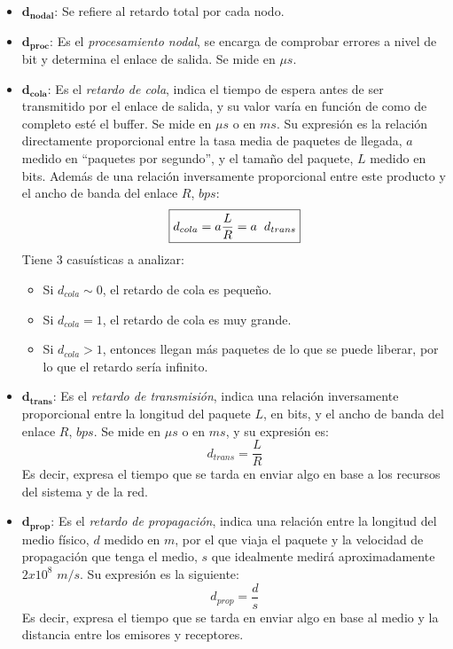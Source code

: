 \begin{itemize}
        \item \(\mathbf{d_{nodal}}\): Se refiere al retardo total por cada nodo.
        \item \(\mathbf{d_{proc}}\): Es el \textit{procesamiento nodal}, se encarga de comprobar errores a nivel de bit y determina el enlace de salida. Se mide en \(\mu s\).
        \item \(\mathbf{d_{cola}}\): Es el \textit{retardo de cola}, indica el tiempo de espera antes de ser transmitido por el enlace de salida, y su valor varía en función de como de completo esté el buffer. Se mide en \(\mu s\) o en \(ms\). Su expresión es la relación directamente proporcional entre la tasa media de paquetes de llegada, \(a\) medido en ``paquetes por segundo'', y el tamaño del paquete, \(L\) medido en bits. Además de una relación inversamente proporcional entre este producto y el ancho  de banda del enlace \(R\), \(bps\):
              \[
                      \boxed{d_{cola} = a \frac{L}{R} = a \hspace{2mm}d_{trans}}
              \]
              Tiene 3 casuísticas a analizar:
              \begin{itemize}
                      \item Si \(d_{cola} \sim 0 \), el retardo de cola es pequeño.
                      \item Si \(d_{cola} = 1 \), el retardo de cola es muy grande.
                      \item Si \(d_{cola} > 1 \), entonces llegan más paquetes de lo que se puede liberar, por lo que el retardo sería infinito.
              \end{itemize}
        \item \(\mathbf{d_{trans}}\): Es el \textit{retardo de transmisión}, indica una relación inversamente proporcional entre la longitud del paquete \(L\), en bits, y el ancho  de banda del enlace \(R\), \(bps\). Se mide en \(\mu s\) o en \(ms\), y su expresión es:
              \[
                      \boxed{d_{trans} = \frac{L}{R}}
              \]
              \noindent Es decir, expresa el tiempo que se tarda en enviar algo en base a los recursos del sistema y de la red.
        \item \(\mathbf{d_{prop}}\): Es el \textit{retardo de propagación}, indica una relación entre la longitud del medio físico, \(d\) medido en \(m\), por el que viaja el paquete y la velocidad de propagación que tenga el medio, \(s\) que idealmente medirá aproximadamente \(2x10^8\) \(m/s\). Su expresión es la siguiente:
              \[
                      \boxed{d_{prop} = \frac{d}{s}}
              \]
              \noindent Es decir, expresa el tiempo que se tarda en enviar algo en base al medio y la distancia entre los emisores y receptores.
\end{itemize}
